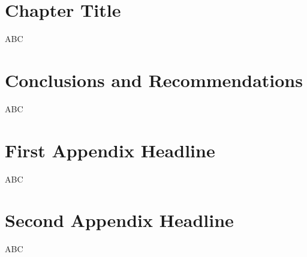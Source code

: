 \documentclass[12pt]{report}
\begin{document}
\begin{mainf}
\clearpage




\chapter{Chapter Title}

ABC

\clearpage




\chapter{Conclusions and Recommendations}

ABC

\clearpage






\end{mainf}



\titleformat{\chapter}[hang]{\large\raggedright\bfseries}{\thechapter}{0 pt}{}
\titlespacing*{\chapter}{0pt}{-25 pt}{6 pt} %
\renewcommand\bibname{References}
{}
\setlength{\bibsep}{0pt}




\clearpage

\appendix
\multappendices %

\chapter{First Appendix Headline}

ABC

\clearpage

\chapter{Second Appendix Headline}

ABC

\clearpage
\end{document}
